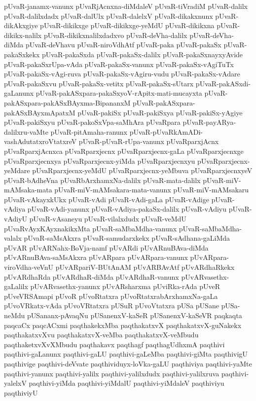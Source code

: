 {pUvaR-janamx-vanunx
pUvaRjAcnxna-diMdaleV
pUvaR-tiVradiM
pUvaR-dalilx
pUvaR-dalilxdadx
pUvaR-dalUlx
pUvaR-dalelxV
pUvaR-dikakxnunx
pUvaR-dikAkxgiye
pUvaR-dikikxge
pUvaR-dikikxge-yeMdU
pUvaR-dikikxna
pUvaR-dikikx-nalilx
pUvaR-dikikxnalilxdadxvo
pUvaR-deVha-dalilx
pUvaR-deVha-diMda
pUvaR-deVhavu
pUvaR-niroVdhAtf
pUvaR-paka
pUvaR-pakaSx
pUvaR-pakaSxkekx
pUvaR-pakaSxda
pUvaR-pakaSx-dalilx
pUvaR-pakaSxnayxyAvide
pUvaR-pakaSxrUpa-vAda
pUvaR-pakaSx-vanunx
pUvaR-pakaSx-vAgiTuTx
pUvaR-pakaSx-vAgi-ruva
pUvaR-pakaSx-vAgiru-vudu
pUvaR-pakaSx-vAdare
pUvaR-pakaSxvu
pUvaR-pakaSx-vetitx
pUvaR-pakaSx-sUtarx
pUvaR-pakASxdi-gaLanunx
pUvaR-pakASxpara-pakaSxyoV-rApitx-mati-mucayxta
pUvaR-pakASxpara-pakASxBAyxma-BipananxM
pUvaR-pakASxpara-pakASxBAyxmApatxM
pUvaR-pakiSx
pUvaR-pakiSxya
pUvaR-pakiSx-yAgiye
pUvaR-pakiSxyu
pUvaR-pakoSxVpa-saMhAra
pUvaRpara
pUvaR-payARya-dalilxru-vaMte
pUvaR-pitAmaha-ranunx
pUvaR-pUvaRkAmADi-vashAdutatxroVtatxreV
pUvaR-pUvaR-rUpa-vanunx
pUvaRparxjAcnx
pUvaRparxjAcnxca
pUvaRparxjecnx
pUvaRparxjecnx-gaLa
pUvaRparxjecnxge
pUvaRparxjecnxya
pUvaRparxjecnx-yiMda
pUvaRparxjecnxyu
pUvaRparxjecnx-yeMdare
pUvaRparxjecnx-yeMdU
pUvaRparxjecnx-yeMbuva
pUvaRparxjecnxyeV
pUvaR-bAdheVna
pUvaRbArxhamxNa-dalilx
pUvaR-mata-dalilx
pUvaR-miV-mAMsaka-mata
pUvaR-miV-mAMsakara-mata-vanunx
pUvaR-miV-mAMsakaru
pUvaR-vAkayxkUkx
pUvaR-vAdi
pUvaR-vAdi-gaLa
pUvaR-vAdige
pUvaR-vAdiya
pUvaR-vAdi-yanunx
pUvaR-vAdiya-pakaSx-dalilx
pUvaR-vAdiyu
pUvaR-vAdiyU
pUvaR-vAsaneyu
pUvaR-vilalxdudx
pUvaR-veMdU
pUvaRvAyxKAyxnakikxMta
pUvaR-saMbaMdha-vanunx
pUvaR-saMbaMdha-valalx
pUvaR-saMsAkxra
pUvaR-samudarxkekx
pUvaR-sAdhana-gaLiMda
pUvAR
pUvARNahx-BoVja-namf
pUvARdi
pUvARnuBAva-diMda
pUvARnuBAva-saMsAkxra
pUvARpara
pUvARpara-vanunx
pUvARpara-viroVdha-veVnU
pUvARpariV-BUtAnAM
pUvARBAvAtf
pUvARdhaRkekx
pUvARdhaRda
pUvARdhaR-diMda
pUvARdhaR-vanunx
pUvARvasethx-gaLalilx
pUvARvasethx-yanunx
pUvARsharxma
pUviRka-rAda
pUveR
pUveVRSAmapi
pUvoR
pUvoRtatxra
pUvoRtatxrabArxhamxNa-gaLa
pUvoVRkatx-vAda
pUvoVRtatxra
pUSuR
pUvoVtatxra
pUSa
pUSane
pUSa-neMdu
pUSananx-pAvaqNu
pUSanenxV-kaSeR
pUSanenxV-kaSeVR
paqkaqta
paqcaCx
paqcACxmi
paqthakekxMba
paqthakatxvX
paqthakatxvX-guNakekx
paqthakatxvXvu
paqthakatxvX-veMba
paqthakatxvX-veMbudu
paqthaketxvXvXMbudu
paqthakavx
paqthagf
paqthagUdhxmA
paqthivi
paqthivi-gaLanunx
paqthivi-gaLU
paqthivi-gaLeMba
paqthivi-giMta
paqthivigU
paqthivige
paqthivi-deVvate
paqthividuyx-loVka-gaLU
paqthiviya
paqthivi-yaMte
paqthivi-yanunx
paqthivi-yalilx
paqthivi-yalilxdudx
paqthivi-yalilxruva
paqthivi-yalelxV
paqthivi-yiMda
paqthivi-yiMdalU
paqthivi-yiMdaleV
paqthiviyu
paqthiviyU
}
